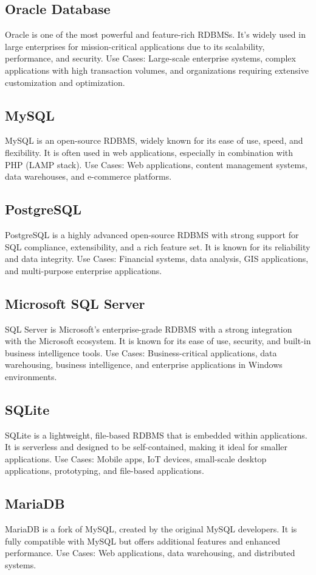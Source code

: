 \documentclass[openany]{book} %
\begin{document}
\subsection{Oracle Database}
Oracle is one of the most powerful and feature-rich RDBMSs. It's widely used in large enterprises for mission-critical applications due to its scalability, performance, and security.
Use Cases: Large-scale enterprise systems, complex applications with high transaction volumes, and organizations requiring extensive customization and optimization.
\subsection{MySQL}
MySQL is an open-source RDBMS, widely known for its ease of use, speed, and flexibility. It is often used in web applications, especially in combination with PHP (LAMP stack).
Use Cases: Web applications, content management systems, data warehouses, and e-commerce platforms.
\subsection{PostgreSQL}
PostgreSQL is a highly advanced open-source RDBMS with strong support for SQL compliance, extensibility, and a rich feature set. It is known for its reliability and data integrity.
Use Cases: Financial systems, data analysis, GIS applications, and multi-purpose enterprise applications.
\subsection{Microsoft SQL Server}
SQL Server is Microsoft's enterprise-grade RDBMS with a strong integration with the Microsoft ecosystem. It is known for its ease of use, security, and built-in business intelligence tools.
Use Cases: Business-critical applications, data warehousing, business intelligence, and enterprise applications in Windows environments.
\subsection{SQLite}
SQLite is a lightweight, file-based RDBMS that is embedded within applications. It is serverless and designed to be self-contained, making it ideal for smaller applications.
Use Cases: Mobile apps, IoT devices, small-scale desktop applications, prototyping, and file-based applications.
\subsection{MariaDB}
MariaDB is a fork of MySQL, created by the original MySQL developers. It is fully compatible with MySQL but offers additional features and enhanced performance.
Use Cases: Web applications, data warehousing, and distributed systems.
\end{document}
